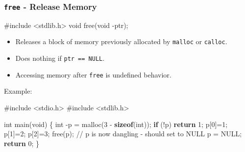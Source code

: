 \documentclass[
  letterpaper,
  DIV=11,
  numbers=noendperiod]{scrreprt}
\newenvironment{Shaded}{\begin{snugshade}}{\end{snugshade}}
\newcommand{\CommentTok}[1]{\textcolor[rgb]{0.37,0.37,0.37}{#1}}
\newcommand{\ControlFlowTok}[1]{\textcolor[rgb]{0.00,0.23,0.31}{\textbf{#1}}}
\newcommand{\DataTypeTok}[1]{\textcolor[rgb]{0.68,0.00,0.00}{#1}}
\newcommand{\DecValTok}[1]{\textcolor[rgb]{0.68,0.00,0.00}{#1}}
\newcommand{\ImportTok}[1]{\textcolor[rgb]{0.00,0.46,0.62}{#1}}
\newcommand{\KeywordTok}[1]{\textcolor[rgb]{0.00,0.23,0.31}{\textbf{#1}}}
\newcommand{\NormalTok}[1]{\textcolor[rgb]{0.00,0.23,0.31}{#1}}
\newcommand{\OperatorTok}[1]{\textcolor[rgb]{0.37,0.37,0.37}{#1}}
\newcommand{\PreprocessorTok}[1]{\textcolor[rgb]{0.68,0.00,0.00}{#1}}
\providecommand{\tightlist}{%
  \setlength{\itemsep}{0pt}\setlength{\parskip}{0pt}}
\begin{document}
\subsubsection{\texorpdfstring{\texttt{free} - Release
Memory}{free - Release Memory}}\label{free---release-memory}

\begin{Shaded}
\begin{Highlighting}[]
\PreprocessorTok{\#include }\ImportTok{\textless{}stdlib.h\textgreater{}}
\DataTypeTok{void}\NormalTok{ free}\OperatorTok{(}\DataTypeTok{void} \OperatorTok{{-}}\NormalTok{ptr}\OperatorTok{);}
\end{Highlighting}
\end{Shaded}

\begin{itemize}
\tightlist
\item
  Releases a block of memory previously allocated by \texttt{malloc} or
  \texttt{calloc}.
\item
  Does nothing if \texttt{ptr\ ==\ NULL}.
\item
  Accessing memory after \texttt{free} is undefined behavior.
\end{itemize}

Example:

\begin{Shaded}
\begin{Highlighting}[]
\PreprocessorTok{\#include }\ImportTok{\textless{}stdio.h\textgreater{}}
\PreprocessorTok{\#include }\ImportTok{\textless{}stdlib.h\textgreater{}}

\DataTypeTok{int}\NormalTok{ main}\OperatorTok{(}\DataTypeTok{void}\OperatorTok{)} \OperatorTok{\{}
    \DataTypeTok{int} \OperatorTok{{-}}\NormalTok{p }\OperatorTok{=}\NormalTok{ malloc}\OperatorTok{(}\DecValTok{3} \OperatorTok{{-}} \KeywordTok{sizeof}\OperatorTok{(}\DataTypeTok{int}\OperatorTok{));}
    \ControlFlowTok{if} \OperatorTok{(!}\NormalTok{p}\OperatorTok{)} \ControlFlowTok{return} \DecValTok{1}\OperatorTok{;}
\NormalTok{    p}\OperatorTok{[}\DecValTok{0}\OperatorTok{]=}\DecValTok{1}\OperatorTok{;}\NormalTok{ p}\OperatorTok{[}\DecValTok{1}\OperatorTok{]=}\DecValTok{2}\OperatorTok{;}\NormalTok{ p}\OperatorTok{[}\DecValTok{2}\OperatorTok{]=}\DecValTok{3}\OperatorTok{;}
\NormalTok{    free}\OperatorTok{(}\NormalTok{p}\OperatorTok{);}
    \CommentTok{// p is now dangling {-} should set to NULL}
\NormalTok{    p }\OperatorTok{=}\NormalTok{ NULL}\OperatorTok{;}
    \ControlFlowTok{return} \DecValTok{0}\OperatorTok{;}
\OperatorTok{\}}
\end{Highlighting}
\end{Shaded}
\end{document}
